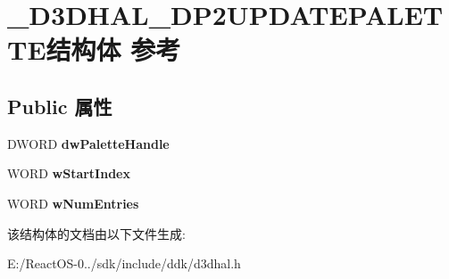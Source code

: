 \hypertarget{struct___d3_d_h_a_l___d_p2_u_p_d_a_t_e_p_a_l_e_t_t_e}{}\section{\+\_\+\+D3\+D\+H\+A\+L\+\_\+\+D\+P2\+U\+P\+D\+A\+T\+E\+P\+A\+L\+E\+T\+T\+E结构体 参考}
\label{struct___d3_d_h_a_l___d_p2_u_p_d_a_t_e_p_a_l_e_t_t_e}
\subsection*{Public 属性}
\begin{DoxyCompactItemize}
\item 
\mbox{\label{struct___d3_d_h_a_l___d_p2_u_p_d_a_t_e_p_a_l_e_t_t_e_aacf46dbcf333451be0548f264ed96854}} 
D\+W\+O\+RD {\bfseries dw\+Palette\+Handle}
\item 
\mbox{\label{struct___d3_d_h_a_l___d_p2_u_p_d_a_t_e_p_a_l_e_t_t_e_a912b0df66a7f6e1cd7b0557d117f7f5e}} 
W\+O\+RD {\bfseries w\+Start\+Index}
\item 
\mbox{\label{struct___d3_d_h_a_l___d_p2_u_p_d_a_t_e_p_a_l_e_t_t_e_a1dacc94f2d50e427e681faf2fb4e2e24}} 
W\+O\+RD {\bfseries w\+Num\+Entries}
\end{DoxyCompactItemize}


该结构体的文档由以下文件生成\+:\begin{DoxyCompactItemize}
\item 
E\+:/\+React\+O\+S-\/0../sdk/include/ddk/d3dhal.\+h\end{DoxyCompactItemize}
